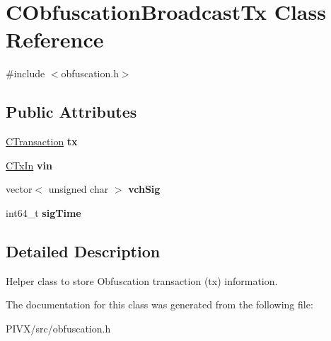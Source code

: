 \hypertarget{class_c_obfuscation_broadcast_tx}{}\section{C\+Obfuscation\+Broadcast\+Tx Class Reference}
\label{class_c_obfuscation_broadcast_tx}


{\ttfamily \#include $<$obfuscation.\+h$>$}

\subsection*{Public Attributes}
\begin{DoxyCompactItemize}
\item 
\mbox{\label{class_c_obfuscation_broadcast_tx_a5a66cd30ee38f8826386df6a8ccbae90}} 
\mbox{\hyperlink{class_c_transaction}{C\+Transaction}} {\bfseries tx}
\item 
\mbox{\label{class_c_obfuscation_broadcast_tx_ac14d48764ae701b6bcf8d52e03ac28fc}} 
\mbox{\hyperlink{class_c_tx_in}{C\+Tx\+In}} {\bfseries vin}
\item 
\mbox{\label{class_c_obfuscation_broadcast_tx_a6094d39e3edd3d0519f6843dac316cde}} 
vector$<$ unsigned char $>$ {\bfseries vch\+Sig}
\item 
\mbox{\label{class_c_obfuscation_broadcast_tx_ad01d66b9192f9b36f0528ec77471b09f}} 
int64\+\_\+t {\bfseries sig\+Time}
\end{DoxyCompactItemize}


\subsection{Detailed Description}
Helper class to store Obfuscation transaction (tx) information. 

The documentation for this class was generated from the following file\+:\begin{DoxyCompactItemize}
\item 
P\+I\+V\+X/src/obfuscation.\+h\end{DoxyCompactItemize}
